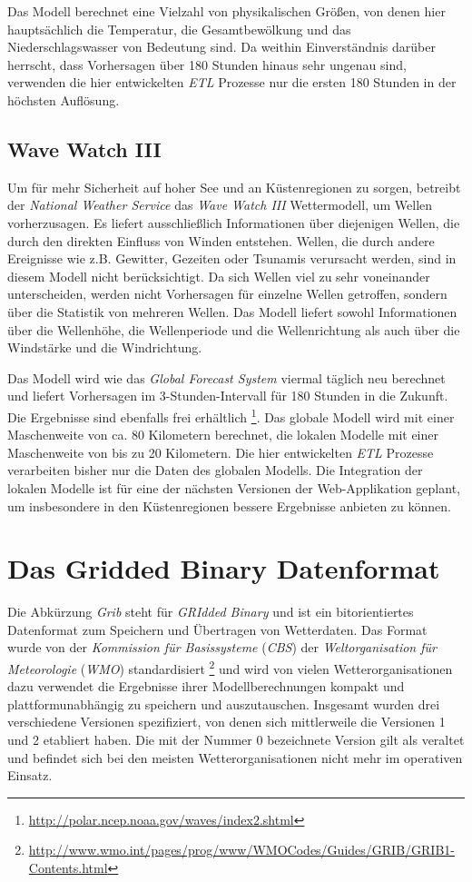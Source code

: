 Das Modell berechnet eine Vielzahl von physikalischen Größen, von
denen hier hauptsächlich die Temperatur, die Gesamtbewölkung und das
Niederschlagswasser von Bedeutung sind. Da weithin Einverständnis
darüber herrscht, dass Vorhersagen über 180 Stunden hinaus sehr
ungenau sind, verwenden die hier entwickelten \textit{ETL} Prozesse
nur die ersten 180 Stunden in der höchsten Auflösung.

\subsection{Wave Watch III}
Um für mehr Sicherheit auf hoher See und an Küstenregionen zu sorgen,
betreibt der \textit{National Weather Service} das \textit{Wave Watch
  III} Wettermodell, um Wellen vorherzusagen. Es liefert
ausschließlich Informationen über diejenigen Wellen, die durch den
direkten Einfluss von Winden entstehen. Wellen, die durch andere
Ereignisse wie z.B. Gewitter, Gezeiten oder Tsunamis verursacht
werden, sind in diesem Modell nicht berücksichtigt. Da sich Wellen
viel zu sehr voneinander unterscheiden, werden nicht Vorhersagen für
einzelne Wellen getroffen, sondern über die Statistik von mehreren
Wellen. Das Modell liefert sowohl Informationen über die Wellenhöhe,
die Wellenperiode und die Wellenrichtung als auch über die Windstärke
und die Windrichtung.

Das Modell wird wie das \textit{Global Forecast System} viermal
täglich neu berechnet und liefert Vorhersagen im 3-Stunden-Intervall
für 180 Stunden in die Zukunft. Die Ergebnisse sind ebenfalls frei
erhältlich
\footnote{\url{http://polar.ncep.noaa.gov/waves/index2.shtml}}. Das
globale Modell wird mit einer Maschenweite von ca. 80 Kilometern
berechnet, die lokalen Modelle mit einer Maschenweite von bis zu 20
Kilometern. Die hier entwickelten \textit{ETL} Prozesse verarbeiten
bisher nur die Daten des globalen Modells. Die Integration der lokalen
Modelle ist für eine der nächsten Versionen der Web-Applikation
geplant, um insbesondere in den Küstenregionen bessere Ergebnisse
anbieten zu können.

\section{Das Gridded Binary Datenformat}
Die Abkürzung \textit{Grib}  steht
für \textit{GRIdded Binary} und ist ein bitorientiertes Datenformat
zum Speichern und Übertragen von Wetterdaten. Das Format wurde von der
\textit{Kommission für Basissysteme} (\textit{CBS})
 der
\textit{Weltorganisation für Meteorologie} (\textit{WMO})
 standardisiert
\footnote{\url{http://www.wmo.int/pages/prog/www/WMOCodes/Guides/GRIB/GRIB1-Contents.html}}
und wird von vielen Wetterorganisationen dazu verwendet die Ergebnisse
ihrer Modellberechnungen kompakt und plattformunabhängig zu speichern
und auszutauschen. Insgesamt wurden drei verschiedene Versionen
spezifiziert, von denen sich mittlerweile die Versionen 1 und 2
etabliert haben. Die mit der Nummer 0 bezeichnete Version gilt als
veraltet und befindet sich bei den meisten Wetterorganisationen nicht
mehr im operativen Einsatz.

